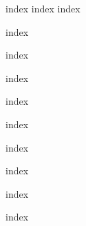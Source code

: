 \documentclass{article}
\begin{document}
{index}
{index}
{index}

\newpage


{index}

\newpage

{index}

\newpage


{index}

\newpage

{index}

{index}

\newpage

{index}

\newpage

{index}

\newpage

{index}

\newpage

{index}
\end{document}
